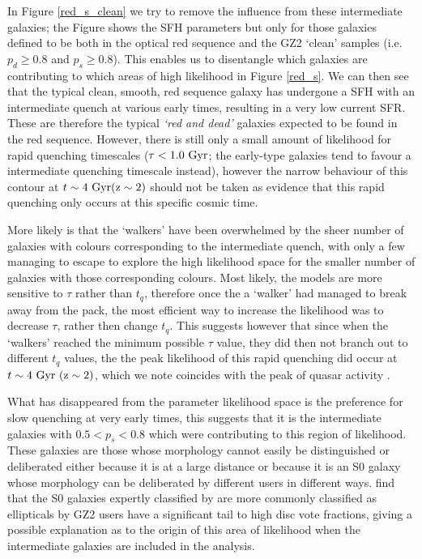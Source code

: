 \documentclass[useAMS,usenatbib]{mn2e}
\begin{document}
In Figure \ref{red_s_clean} we try to remove the influence from these intermediate galaxies; the Figure shows the SFH parameters but only for those galaxies defined to be both in the optical red sequence and the GZ2 `clean' samples (i.e. $p_d \geq 0.8$ and $p_s \geq 0.8$). This enables us to disentangle which galaxies are contributing to which areas of high likelihood in Figure \ref{red_s}. We can then see that the typical clean, smooth, red sequence galaxy has undergone a SFH with an intermediate quench at various early times, resulting in a very low current SFR. These are therefore the typical \emph{`red and dead'} galaxies expected to be found in the red sequence. However, there is still only a small amount of likelihood for rapid quenching timescales ($\tau < 1.0~\rm{Gyr}$; the early-type galaxies tend to favour a intermediate quenching timescale instead), however the narrow behaviour of this contour at $t\sim4~\rm{Gyr} (z\sim2)$ should not be taken as evidence that this rapid quenching only occurs at this specific cosmic time. 

More likely is that the `walkers' have been overwhelmed by the sheer number of galaxies with colours corresponding to the intermediate quench, with only a few managing to escape to explore the high likelihood space for the smaller number of galaxies with those corresponding colours. Most likely, the models are more sensitive to $\tau$ rather than $t_q$, therefore once the a `walker' had managed to break away from the pack, the most efficient way to increase the likelihood was to decrease $\tau$, rather then change $t_q$. This suggests however that since when the `walkers' reached the minimum possible $\tau$ value, they did then not branch out to different $t_q$ values, the the peak likelihood of this rapid quenching did occur at $t\sim4~\rm{Gyr} ~(z\sim2)$, which we note coincides with the peak of quasar activity \citep{Falomo08}.

What has disappeared from the parameter likelihood space is the preference for slow quenching at very early times, this suggests that it is the intermediate galaxies with $0.5 < p_s < 0.8$ which were contributing to this region of likelihood. These galaxies are those whose morphology cannot easily be distinguished or deliberated either because it is at a large distance or because it is an S0 galaxy whose morphology can be deliberated by different users in different ways. \citet{GZ2} find that the S0 galaxies expertly classified by \citet{NA10} are more commonly classified as ellipticals by GZ2 users have a significant tail to high disc vote fractions, giving a possible explanation as to the origin of this area of likelihood when the intermediate galaxies are included in the analysis.
\end{document}

